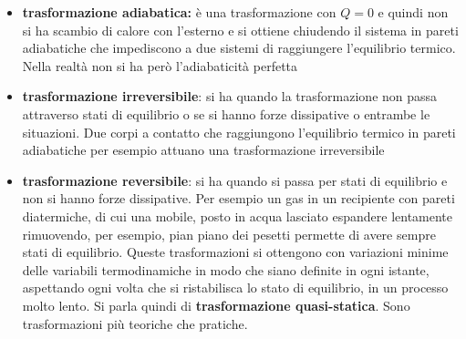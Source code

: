 \documentclass[a4paper,12pt, oneside]{book}
\begin{document}
\begin{itemize}
\item \textbf{trasformazione adiabatica:} è una trasformazione con $Q=0$ e quindi non si ha scambio di calore con l'esterno e si ottiene chiudendo il sistema in pareti adiabatiche che impediscono a  due sistemi di raggiungere l'equilibrio termico. Nella realtà non si ha però l'adiabaticità perfetta
\item \textbf{trasformazione irreversibile}: si ha quando la trasformazione non passa attraverso stati di equilibrio o se si hanno forze dissipative o entrambe le situazioni. Due corpi a contatto che raggiungono l'equilibrio termico in pareti adiabatiche per esempio attuano una trasformazione irreversibile
\item \textbf{trasformazione reversibile}: si ha quando si passa per stati di equilibrio e non si hanno forze dissipative. Per esempio un gas in un recipiente con pareti diatermiche, di cui una mobile, posto in acqua lasciato espandere lentamente rimuovendo, per esempio, pian piano dei pesetti permette di avere sempre stati di equilibrio. Queste trasformazioni si ottengono con variazioni minime delle variabili termodinamiche in modo che siano definite in ogni istante, aspettando ogni volta che si ristabilisca lo stato di equilibrio, in un processo molto lento. Si parla quindi di \textbf{trasformazione quasi-statica}. Sono trasformazioni più teoriche che pratiche. 
\end{itemize}
\end{document}
